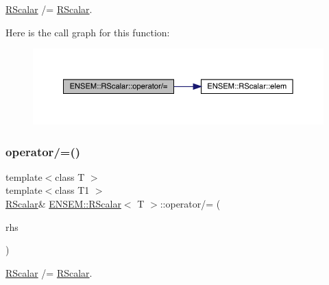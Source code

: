 \mbox{\hyperlink{classENSEM_1_1RScalar}{R\+Scalar}} /= \mbox{\hyperlink{classENSEM_1_1RScalar}{R\+Scalar}}. 

Here is the call graph for this function\+:
\nopagebreak
\begin{figure}[H]
\begin{center}
\leavevmode
\includegraphics[width=350pt]{d0/d8c/classENSEM_1_1RScalar_a8d8cc49d7fed142b93c987c653465000_cgraph}
\end{center}
\end{figure}
\mbox{\label{classENSEM_1_1RScalar_a8d8cc49d7fed142b93c987c653465000}} 
\subsubsection{\texorpdfstring{operator/=()}{operator/=()}\hspace{0.1cm}{\footnotesize\ttfamily [2/2]}}
{\footnotesize\ttfamily template$<$class T $>$ \\
template$<$class T1 $>$ \\
\mbox{\hyperlink{classENSEM_1_1RScalar}{R\+Scalar}}\& \mbox{\hyperlink{classENSEM_1_1RScalar}{E\+N\+S\+E\+M\+::\+R\+Scalar}}$<$ T $>$\+::operator/= (\begin{DoxyParamCaption}\item[{const \mbox{\hyperlink{classENSEM_1_1RScalar}{R\+Scalar}}$<$ T1 $>$ \&}]{rhs }\end{DoxyParamCaption})\hspace{0.3cm}{\ttfamily [inline]}}



\mbox{\hyperlink{classENSEM_1_1RScalar}{R\+Scalar}} /= \mbox{\hyperlink{classENSEM_1_1RScalar}{R\+Scalar}}. 

